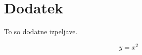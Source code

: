 \section{Dodatek}\label{sec:dodatek}
To so dodatne izpeljave.

\begin{equation}\label{eq:dodatekA}
  y = x^2
\end{equation}
